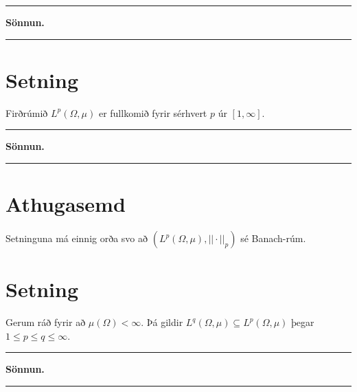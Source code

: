\documentclass[]{book}
\begin{document}
\begin{center}\rule{0.5\linewidth}{\linethickness}\end{center}

\textbf{Sönnun.}

\begin{center}\rule{0.5\linewidth}{\linethickness}\end{center}

\hypertarget{setning-71}{%
\section*{Setning}\label{setning-71}}

Firðrúmið \(L^p(\Omega,\mu)\) er fullkomið fyrir sérhvert \(p\) úr \([1,\infty]\).

\begin{center}\rule{0.5\linewidth}{\linethickness}\end{center}

\textbf{Sönnun.}

\begin{center}\rule{0.5\linewidth}{\linethickness}\end{center}

\hypertarget{athugasemd-5}{%
\section*{Athugasemd}\label{athugasemd-5}}

Setninguna má einnig orða svo að \((L^p(\Omega,\mu), ||\cdot||_p)\) sé Banach-rúm.

\hypertarget{setning-72}{%
\section*{Setning}\label{setning-72}}

Gerum ráð fyrir að \(\mu(\Omega) < \infty\). Þá gildir \(L^q(\Omega,\mu)\subseteq L^p(\Omega, \mu)\) þegar \(1\leq p \leq q \leq \infty\).

\begin{center}\rule{0.5\linewidth}{\linethickness}\end{center}

\textbf{Sönnun.}

\begin{center}\rule{0.5\linewidth}{\linethickness}\end{center}
\end{document}
